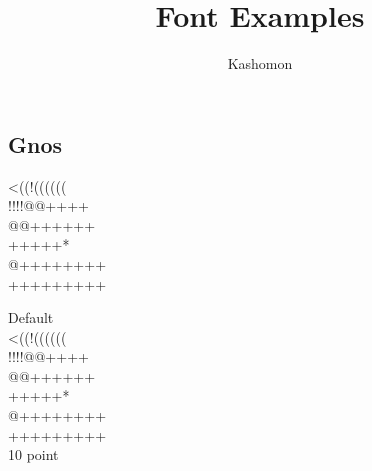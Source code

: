 \documentclass{article}
\begin{document}
\title{Font Examples}
\author{Kashomon}
\maketitle

\begin{center}
\section*{Gnos}
{\gnos%
<((!((((((\\
!!!!@@++++\\
@@++++++\\
+++++*\\
@++++++++\\
+++++++++\\
}

Default
\\

{
{\gnossixteen
<((!((((((\\
!!!!@@++++\\
@@++++++\\
+++++*\\
@++++++++\\
+++++++++\\
}
10 point
}

\end{center}
\end{document}
